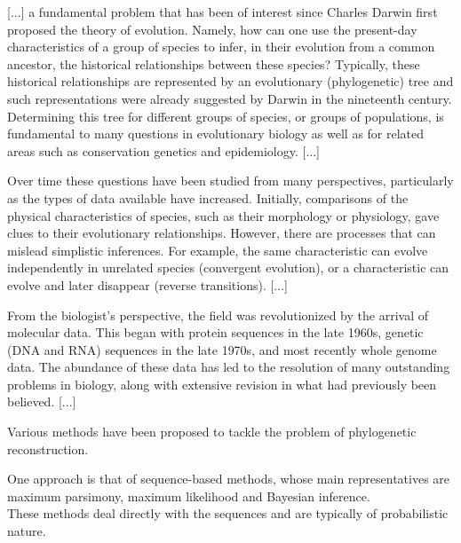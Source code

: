 \documentclass[./main.tex]{subfiles}
\begin{document}
\ifSubfilesClassLoaded{\mainmatter}{}

 \label{chap:intro}

\begin{displayquote}
    \textup{[...]} a fundamental problem that has been of interest since Charles Darwin first proposed the theory of evolution. Namely, how can one use the present-day characteristics of a group of species to infer, in their evolution from a common ancestor, the historical relationships between these species? Typically, these historical relationships are represented by an evolutionary (phylogenetic) tree and such representations were already suggested by Darwin in the nineteenth century. Determining this tree for different groups of species, or groups of populations, is fundamental to many questions in evolutionary biology as well as for related areas such as conservation genetics and epidemiology. \textup{[...]} \par
    Over time these questions have been studied from many perspectives, particularly as the types of data available have increased. Initially, comparisons of the physical characteristics of species, such as their morphology or physiology, gave clues to their evolutionary relationships. However, there are processes that can mislead simplistic inferences. For example, the same characteristic can evolve independently in unrelated species (convergent evolution), or a characteristic can evolve and later disappear (reverse transitions). \textup{[...]} \par
    From the biologist's perspective, the field was revolutionized by the arrival of molecular data. This began with protein sequences in the late 1960s, genetic (DNA and RNA) sequences in the late 1970s, and most recently whole genome data. The abundance of these data has led to the resolution of many outstanding problems in biology, along with extensive revision in what had previously been believed. \textup{[...]}
\end{displayquote}

\clearpage

Various methods have been proposed to tackle the problem of phylogenetic reconstruction.

One approach is that of sequence-based methods, whose main representatives are maximum parsimony, maximum likelihood and Bayesian inference. \\
These methods deal directly with the sequences and are typically of probabilistic nature.
\end{document}
